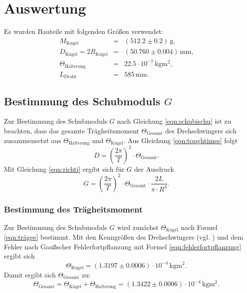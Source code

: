\section{Auswertung}
\label{sec:Auswertung}
Es wurden Bauteile mit folgenden Größen verwendet:
\begin{equation}
	\label{eqn:bauteile}
	\begin{aligned}
		M_{\mathrm{Kugel}}                       & = & (512.2 \pm 0.2) \,\si{\gram}\text{,}                       \\
		D_{\mathrm{Kugel}} = 2R_{\mathrm{Kugel}} & = & (50.760\pm 0.004)\,\si{\milli\meter} \text{,}              \\
		\Theta_{\mathrm{Halterung}}              & = & 22.5 \cdot 10^{-7} \, \si{\kilo\gram\square\metre}\text{,} \\
		L_{\mathrm{Draht}}                       & = & 585 \,\si{\milli\meter} \text{.}
	\end{aligned}
\end{equation}
\FloatBarrier

\subsection{Bestimmung des Schubmoduls $G$}
Zur Bestimmung des Schubmoduls $G$ nach Gleichung \eqref{eqn:schubischu} ist zu beachten,
dass das gesamte Trägheitsmoment $\Theta_{\mathrm{Gesamt}}$ des Drehschwingers sich zusammensetzt aus
$\Theta_{\mathrm{Halterung}}$ und $\Theta_{\mathrm{Kugel}}$.
Aus Gleichung \eqref{eqn:toughtimes} folgt
\begin{equation*}
	\label{eqn:dattD}
	D=\left(\frac{2\pi}{T}\right)^2 \cdot \Theta_{\mathrm{Gesamt}} \mathrm{.}
\end{equation*}
Mit Gleichung \eqref{eqn:richti} ergibt sich für $G$ der Ausdruck
\begin{equation*}
	\label{eqn:richtigerG}
	G=\left(\frac{2\pi}{T}\right)^2 \cdot \Theta_{\mathrm{Gesamt}}\cdot \frac{2L}{\pi\cdot R^4} \mathrm{.}
\end{equation*}
\subsubsection{Bestimmung des Trägheitsmoment}
Zur Bestimmung des Schubmoduls $G$ wird zunächst $\Theta_{\mathrm{Kugel}}$ nach Formel \eqref{eqn:trägee} bestimmt.
Mit den Kenngrößen des Drehschwingers (vgl. ) und dem Fehler nach Gaußscher Fehlerfortpflanzung mit Formel \eqref{eqn:fehlerfortpflanzung} ergibt sich
\begin{equation*}
	\Theta_{\mathrm{Kugel}}=(1.3197\pm 0.0006) \cdot 10^{-4} \,\si{\kilo\gram \square\metre} \text{.}
\end{equation*}
Damit ergibt sich $\Theta_{\mathrm{Gesamt}}$ zu:
\begin{equation*}
	\label{eqn:trägemasse}
	\Theta_{\mathrm{Gesamt}}= \Theta_{\mathrm{Kugel}}+\Theta_{\mathrm{Halterung}}= (1.3422\pm 0.0006)
	\cdot 10^{-4} \,\si{\kilo\gram \square\metre} \text{.}
\end{equation*}
